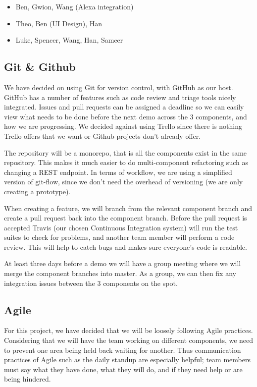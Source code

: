 \documentclass[onecolumn]{IEEEtran}
\begin{document}
\begin{itemize}
    \item Ben, Gwion, Wang (Alexa integration)
    \item Theo, Ben (UI Design), Han
    \item Luke, Spencer, Wang, Han, Sameer
\end{itemize}

\subsection{Git \& Github}

We have decided on using Git for version control, with GitHub as our host. GitHub has a number of features such as code review and triage tools nicely integrated. Issues and pull requests can be assigned a deadline so we can easily view what needs to be done before the next demo across the 3 components, and how we are progressing. We decided against using Trello since there is nothing Trello offers that we want or Github projects don’t already offer.

The repository will be a monorepo, that is all the components exist in the same repository. This makes it much easier to do multi-component refactoring such as changing a REST endpoint. In terms of workflow, we are using a simplified version of git-flow, since we don’t need the overhead of versioning (we are only creating a prototype).

When creating a feature, we will branch from the relevant component branch and create a pull request back into the component branch. Before the pull request is accepted Travis (our chosen Continuous Integration system) will run the test suites to check for problems, and another team member will perform a code review. This will help to catch bugs and makes sure everyone's code is readable.

At least three days before a demo we will have a group meeting where we will merge the component branches into master. As a group, we can then fix any integration issues between the 3 components on the spot.

\subsection{Agile}

For this project, we have decided that we will be loosely following Agile practices. Considering that we will have the team working on different components, we need to prevent one area being held back waiting for another. Thus communication practices of Agile such as the daily standup are especially helpful; team members must say what they have done, what they will do, and if they need help or are being hindered. 
\end{document}
